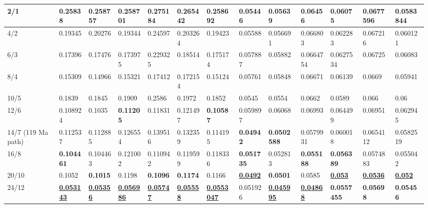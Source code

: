 \begin{landscape}
\begin{table*}
{\begin{tabular}{|l|l|l|l|l|l|l|l|l|l|l|l|l|}
2/1 & 0.25838 & 0.258757 & 0.258701 & 0.275184 & 0.265442 & 0.258692 &
  0.05446 & 0.05639 & 0.06456 & 0.06075 & 0.0677596 & 0.0583844 \\ \hline
4/2 & 0.19345 & 0.20276 & 0.19344 & 0.24597 & 0.203264 & 0.19423 & 0.05588 &
  0.056691 & 0.066803 & 0.062283 & 0.067216 & 0.060121 \\ \hline
6/3 & 0.17396 & 0.17476 & 0.173975 & 0.229325 & 0.18514 & 0.175174 & 0.057887
  & 0.05882 & 0.0664754 & 0.0627534 & 0.06725 & 0.06083 \\ \hline
8/4 & 0.15309 & 0.14966 & 0.15321 & 0.17412 & 0.172154 & 0.15124 & 0.05761 &
  0.05848 & 0.06671 & 0.06139 & 0.0669 & 0.05941 \\ \hline
10/5 & 0.1839 & 0.1845 & 0.1909 & 0.2586 & 0.1972 & 0.1852 &
  0.0545 & 0.0554 & 0.0662 & 0.0589 & 0.066 & 0.06 \\ \hline
12/6 & 0.108924 & 0.1035 & {\color[HTML]{34FF34} \textbf{0.11205}} & 0.11831 &
  0.121497 & {\color[HTML]{34FF34} \textbf{0.10587}} & 0.059897 & 0.06068 &
  0.06993 & 0.064499 & 0.06951 & 0.062945 \\ \hline
14/7 (119\textendash0 Ma path) & 0.112537 & 0.112885 & 0.126554 & 0.139516 &
  0.132359 & 0.114195 & {\color[HTML]{32CB00} \textbf{0.04942}} & {\color[HTML]{34FF34} \textbf{0.0502588}} & 0.0579931 & 0.060018 & 0.0654112 & 0.0582519 \\ \hline
16/8 & {\color[HTML]{34FF34} \textbf{0.104461}} & 0.104463 & 0.121002 &
  0.110942 & 0.119599 & 0.118336 & {\color[HTML]{34FF34} \textbf{0.051735}} &
  0.052813 & {\color[HTML]{34FF34} \textbf{0.055188}} & {\color[HTML]{34FF34} \textbf{0.056389}} & 0.0574883 & 0.055042 \\ \hline
20/10 & 0.1052 & {\color[HTML]{34FF34} \textbf{0.1015}} & 0.1198 &
  {\color[HTML]{34FF34} \textbf{0.1096}} & {\color[HTML]{34FF34}
  \textbf{0.1174}} & 0.1166 & {\color[HTML]{009901} {\ul\textbf{0.0492}}} &
  {\color[HTML]{32CB00} \textbf{0.0501}} & 0.0585 & {\color[HTML]{009901} {\ul\textbf{0.053}}} & {\color[HTML]{009901} {\ul\textbf{0.0536}}} & {\color[HTML]{009901} {\ul\textbf{0.052}}} \\ \hline
24/12 & {\color[HTML]{009901} {\ul\textbf{0.053143}}} & {\color[HTML]{009901}
  {\ul\textbf{0.05356}}} & {\color[HTML]{009901} {\ul\textbf{0.056986}}} &
  {\color[HTML]{009901} {\ul\textbf{0.05747}}} & {\color[HTML]{009901} {\ul\textbf{0.05558}}} & {\color[HTML]{009901} {\ul\textbf{0.0553047}}} &
  0.051926 & {\color[HTML]{009901} {\ul\textbf{0.045995}}} & {\color[HTML]{009901} {\ul\textbf{0.04868}}} &
  {\color[HTML]{32CB00} \textbf{0.0557455}} & {\color[HTML]{34FF34} \textbf{0.05698}} & {\color[HTML]{34FF34} \textbf{0.05456}} \\ \hline

\end{tabular}}
\end{table*}
\end{landscape}
